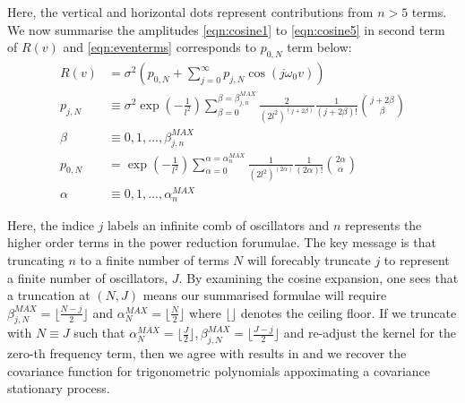 \begin{widetext}
Here, the vertical and horizontal dots represent contributions from $n>5$ terms. We now summarise the amplitudes \cref{eqn:cosine1} to  \cref{eqn:cosine5} in second term of $R(v)$ and  \cref{eqn:eventerms} corresponds to $p_{0,N}$ term below:
\begin{align}
R(v) &= \sigma^2 (p_{0,N} + \sum_{j=0}^{\infty} p_{j,N} \cos(j\omega_0 v))\\
p_{j,N} & \equiv \sigma^2 \exp (- \frac{1}{l^2}) \sum_{\beta = 0}^{\beta = \beta_{j,n}^{MAX}} \frac{2}{(2l^2)^{(j + 2\beta)}} \frac{1}{(j + 2\beta)!} \binom{j + 2\beta}{\beta} \label{eqn:beta_series2} \\
\beta &\equiv  0,1,..., \beta_{j,n}^{MAX}  \\
p_{0,N} &= \exp (- \frac{1}{l^2}) \sum_{\alpha = 0}^{\alpha = \alpha_{n}^{MAX}} \frac{1}{(2l^2)^{(2\alpha)}} \frac{1}{(2\alpha)!} \binom{2\alpha}{\alpha} \label{eqn:alpha_series}\\
\alpha &\equiv  0,1,..., \alpha_{n}^{MAX} 
\end{align}

Here, the indice $j$ labels an infinite comb of oscillators and $n$ represents the higher order terms in the power reduction forumulae. The key message is that truncating $n$ to a finite number of terms $N$ will forecably truncate $j$ to represent a finite number of oscillators, $J$. By examining the cosine expansion, one sees that a truncation at $(N, J)$ means our summarised formulae will require $\beta_{j,N}^{MAX} = \lfloor\frac{N-j}{2}\rfloor$ and $\alpha_{N}^{MAX} = \lfloor\frac{N}{2}\rfloor$  where $\lfloor \rfloor$ denotes the ceiling floor. If we truncate with $N \equiv J$ such that $\alpha_{N}^{MAX} = \lfloor\frac{J}{2}\rfloor, \beta_{j,N}^{MAX} =  \lfloor\frac{J-j}{2}\rfloor $ and re-adjust the kernel for the zero-th frequency term, then we agree with results in \cite{solin2014explicit} and we recover the covariance function for trigonometric polynomials appoximating a covariance stationary process. 
\end{widetext}

